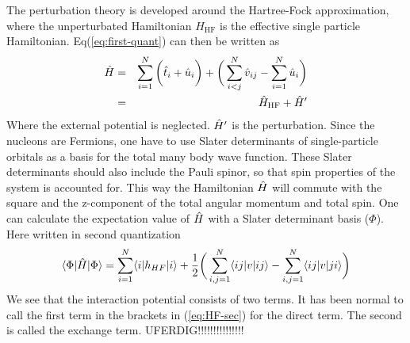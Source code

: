 The perturbation theory is developed around the Hartree-Fock approximation, where the unperturbated Hamiltonian $H_{\text{HF}}$
is the effective single particle Hamiltonian. Eq(\ref{eq:first-quant}) can then be written as
\begin{eqnarray}\label{eq:HF-approx}
\op{H}&=&\sum^N_{i=1}\bigg( \op{t}_i+\op{u}_i\bigg)+\bigg(\sum^N_{i<j}\op{v}_{ij}-\sum^N_{i=1}\op{u}_i\bigg) \nonumber\\   
      &=&\op{H}_{\text{HF}}+\op{H}'
\end{eqnarray}
Where the external potential is neglected. $\hat{H}'$ is the perturbation.
Since the nucleons are Fermions, one have to use Slater determinants of single-particle orbitals as a basis for
the total many body wave function. These Slater determinants should also include the Pauli spinor, so that 
spin properties of the system is accounted for.
This way the Hamiltonian ${\hat{H}}$ will commute with the square and the z-component 
of the total angular momentum and total spin. 
One can calculate the expectation value of $\hat{H}$ with a Slater determinant basis (${{ \Phi}}$). Here written in second quantization
\begin{equation}\label{eq:HF-sec} 
\braketm{{{ \Phi}}}{\op{H}}{{{ \Phi}}}
=\sum^N_{i=1}\braketm{i}{h_{HF}}{i}+\frac{1}{2}\bigg(\sum^N_{i,j=1}\braketm{ij}{v}{ij}-\sum^N_{i,j=1}\braketm{ij}{v}{ji}\bigg) 
\end{equation}
We see that the interaction potential consists of two terms. It has been normal to call
the first term in the brackets in (\ref{eq:HF-sec}) for the direct term. The second is called the exchange term.
UFERDIG!!!!!!!!!!!!!!!





